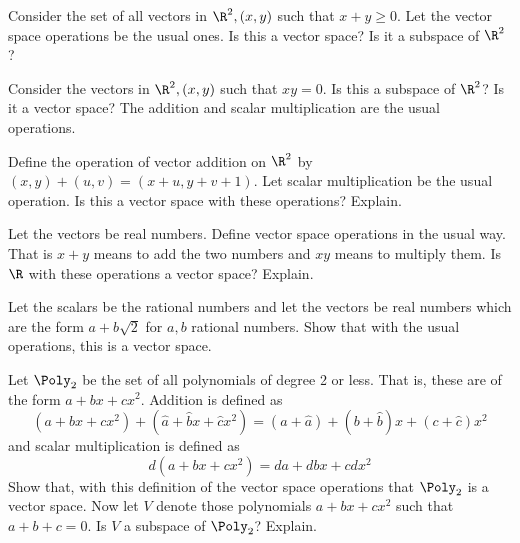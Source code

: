 \begin{ex} Consider the set of all vectors in $\R^{2},(x,y) $
such that $x+y\geq 0$. Let the vector space operations be the usual ones. Is
this a vector space? Is it a subspace of $\R^{2}$?
\end{ex}

\begin{ex} Consider the vectors in $\R^{2},(x,y) $ such that $xy=0$. Is this a subspace of $\R^{2}$? Is it a vector space? The
addition and scalar multiplication are the usual operations.
\end{ex}

\begin{ex} Define the operation of vector addition on $\R^{2}$ by $(
x,y) +(u,v) =(x+u,y+v+1)$. Let scalar
multiplication be the usual operation. Is this a vector space with these
operations? Explain.
\end{ex}

\begin{ex} Let the vectors be real numbers. Define vector space operations in the
usual way. That is $x+y$ means to add the two numbers and $xy$ means to
multiply them. Is $\R$ with these operations a vector space? Explain.
\end{ex}

\begin{ex} Let the scalars be the rational numbers and let the vectors be
real numbers which are the form $a+b\sqrt{2}$ for $a,b$ rational numbers.
Show that with the usual operations, this is a vector space.
\end{ex}

\begin{ex} Let $\Poly_{2}$ be the set of all polynomials of degree 2 or
less. That is, these are of the form $a+bx+cx^{2}$. Addition is defined as
\begin{equation*}
(a+bx+cx^{2}) +(\hat{a}+\hat{b}x+\hat{c}x^{2})
=(a+\hat{a}) +(b+\hat{b}) x+(c+\hat{c})
x^{2}
\end{equation*}
and scalar multiplication is defined as
\begin{equation*}
d(a+bx+cx^{2}) =da+dbx+cdx^{2}
\end{equation*}
Show that, with this definition of the vector space operations that $\Poly_{2}$ is a vector space. Now let $V$ denote those polynomials $a+bx+cx^{2}$
such that $a+b+c=0$. Is $V$ a subspace of $\Poly_{2}$? Explain.
\end{ex}

